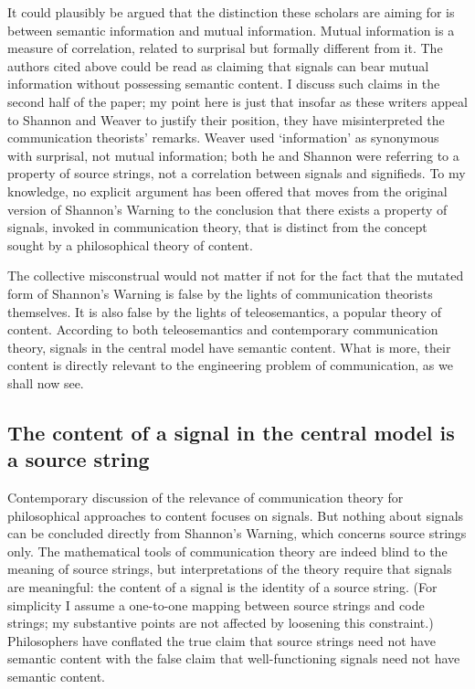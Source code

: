 It could plausibly be argued that the distinction these scholars are aiming for is between semantic information and mutual information.
Mutual information is a measure of correlation, related to surprisal but formally different from it.
The authors cited above could be read as claiming that signals can bear mutual information without possessing semantic content.
I discuss such claims in the second half of the paper; my point here is just that insofar as these writers appeal to Shannon and Weaver to justify their position, they have misinterpreted the communication theorists' remarks.
Weaver used `information' as synonymous with surprisal, not mutual information; both he and Shannon were referring to a property of source strings, not a correlation between signals and signifieds.
To my knowledge, no explicit argument has been offered that moves from the original version of {\sc Shannon's Warning} to the conclusion that there exists a property of signals, invoked in communication theory, that is distinct from the concept sought by a philosophical theory of content.

The collective misconstrual would not matter if not for the fact that the mutated form of {\sc Shannon's Warning} is false by the lights of communication theorists themselves.
It is also false by the lights of teleosemantics, a popular theory of content.
According to both teleosemantics and contemporary communication theory, signals in the central model have semantic content.
What is more, their content is directly relevant to the engineering problem of communication, as we shall now see.


\subsection{The content of a signal in the central model is a source string}\label{subsec:signalContent}

Contemporary discussion of the relevance of communication theory for philosophical approaches to content focuses on signals.
But nothing about signals can be concluded directly from {\sc Shannon's Warning}, which concerns source strings only.
The mathematical tools of communication theory are indeed blind to the meaning of source strings, but interpretations of the theory require that signals are meaningful: the content of a signal is the identity of a source string.
(For simplicity I assume a one-to-one mapping between source strings and code strings; my substantive points are not affected by loosening this constraint.)
Philosophers have conflated the true claim that source strings need not have semantic content with the false claim that well-functioning signals need not have semantic content.

